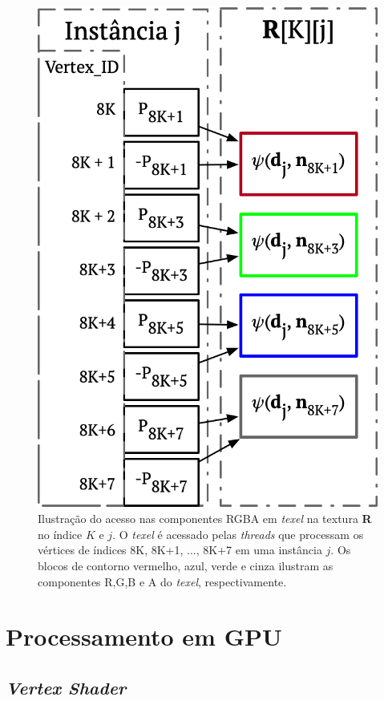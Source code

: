 \begin{figure}[ht]
    \centering
    \includegraphics[width=.45\linewidth, angle=0]{figs/Esquema_Glifo/texellookup.png}
    \caption{Ilustração do acesso nas componentes RGBA em \textit{texel} na textura \textbf{R} no índice $K$ e $j$. O \textit{texel} é acessado pelas \textit{threads} que processam os vértices de índices 8K, 8K+1, ..., 8K+7 em uma instância $j$. Os blocos de contorno vermelho, azul, verde e cinza ilustram as componentes R,G,B e A do \textit{texel}, respectivamente.}
    \label{fig::texelfetch}
\end{figure}

\section{Processamento em GPU}
\label{sec::processamento_GPU}
\subsection{\textit{Vertex Shader}}

